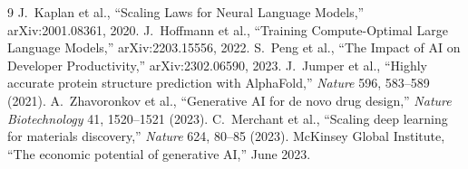 \documentclass[12pt]{article}
\begin{document}
\begin{thebibliography}{9}
 J.\ Kaplan et al., ``Scaling Laws for Neural Language
  Models,'' arXiv:2001.08361, 2020.
 J.\ Hoffmann et al., ``Training Compute-Optimal
  Large Language Models,'' arXiv:2203.15556, 2022.
 S.\ Peng et al., ``The Impact of AI on Developer
  Productivity,'' arXiv:2302.06590, 2023.
 J.\ Jumper et al., ``Highly accurate protein structure
  prediction with AlphaFold,'' \textit{Nature} 596, 583--589 (2021).
 A.\ Zhavoronkov et al., ``Generative AI for de novo
  drug design,'' \textit{Nature Biotechnology} 41, 1520--1521 (2023).
 C.\ Merchant et al., ``Scaling deep learning for
  materials discovery,'' \textit{Nature} 624, 80--85 (2023).
 McKinsey Global Institute, ``The economic potential
  of generative AI,'' June 2023.
\end{thebibliography}
\end{document}
